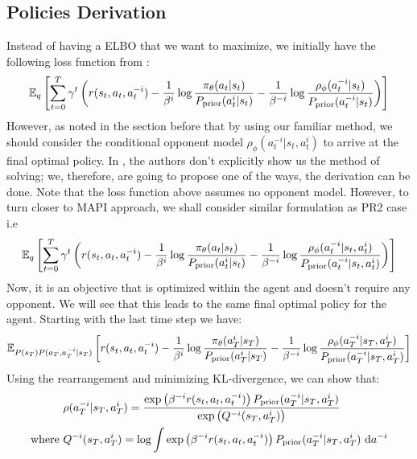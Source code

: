 \label{sec:chap3-balancing-Q}

\subsection{Policies Derivation}
\label{sec:chap3-balancing-Q-derivation}
Instead of having a ELBO that we want to maximize, we initially have the following loss function from \cite{grau2018balancing}:
\begin{equation}
    \mathbb{E}_q\left[ \sum^T_{t=0} \gamma^t \left( r(s_t, a_t, a^{-i}_t) - \frac{1}{\beta^i} \log\frac{\pi_{\theta}(a_t|s_t)}{P_{\text{prior}}(a^i_t|s_t)} - \frac{1}{\beta^{-i}}\log \frac{\rho_\phi(a^{-i}_t|s_t)}{P_{\text{prior}}(a^{-i}_t|s_t)} \right) \right]
\end{equation}
However, as noted in the section before that by using our familiar method, we should consider the conditional opponent model $\rho_\phi(a^{-i}_t | s_t, a^i_t)$ to arrive at the final optimal policy. In \cite{grau2018balancing}, the authors don't explicitly show us the method of solving; we, therefore, are going to propose one of the ways, the derivation can be done. Note that the loss function above assumes no opponent model. However, to turn closer to MAPI approach, we shall consider similar formulation as PR2 \cite{wen2019probabilistic} case i.e 
\begin{equation}
    \mathbb{E}_q\left[ \sum^T_{t=0} \gamma^t \left( r(s_t, a_t, a^{-i}_t) - \frac{1}{\beta^i} \log\frac{\pi_{\theta}(a_t|s_t)}{P_{\text{prior}}(a^i_t|s_t)} - \frac{1}{\beta^{-i}}\log \frac{\rho_\phi(a^{-i}_t | s_t, a^i_t)}{P_{\text{prior}}(a^{-i}_t | s_t, a^i_t)} \right) \right]
\end{equation}
Now, it is an objective that is optimized within the agent and doesn't require any opponent. We will see that this leads to the same final optimal policy for the agent. Starting with the last time step we have:
\begin{equation}
    \mathbb{E}_{P(s_T) P(a_T, a^{-i}_T | s_T)}\left[ r(s_t, a_t, a^{-i}_t) - \frac{1}{\beta^i} \log\frac{\pi_{\theta}(a^i_T|s_T)}{P_{\text{prior}}(a^i_T|s_T)} - \frac{1}{\beta^{-i}}\log \frac{\rho_\phi(a^{-i}_T|s_T, a^i_T)}{P_{\text{prior}}(a^{-i}_T|s_T, a^i_T)} \right]
\end{equation}
Using the rearrangement and minimizing KL-divergence, we can show that:
\begin{equation}
\begin{aligned}
    &\rho(a^{-i}_T | s_T, a^i_T) = \frac{ \exp\left( \beta^{-i} r(s_t, a_t, a^{-i}_t) \right) P_{\text{prior}}(a^{-i}_T|s_T, a^i_T)}{\exp\left( Q^{-i}(s_T, a^{i}_T) \right)}\\
    \text{where }& Q^{-i}(s_T, a^{i}_T) = \log \int \exp\left( \beta^{-i} r(s_t, a_t, a^{-i}_t) \right) P_{\text{prior}}(a^{-i}_T|s_T, a^i_T) \ \mathrm{d} a^{-i}
\end{aligned}
\end{equation}
